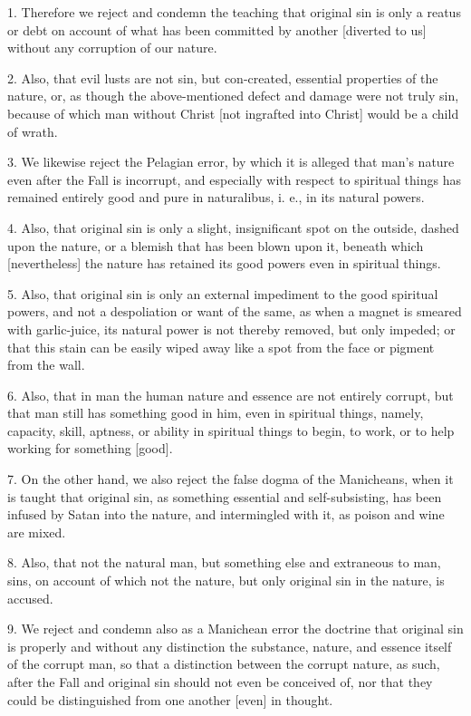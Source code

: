  1. Therefore we reject and condemn the teaching that original sin is only a reatus or debt on account of what has been committed by another [diverted to us] without any corruption of our nature.

 2. Also, that evil lusts are not sin, but con-created, essential properties of the nature, or, as though the above-mentioned defect and damage were not truly sin, because of which man without Christ [not ingrafted into Christ] would be a child of wrath.

 3. We likewise reject the Pelagian error, by which it is alleged that man's nature even after the Fall is incorrupt, and especially with respect to spiritual things has remained entirely good and pure in naturalibus, i. e., in its natural powers.

 4. Also, that original sin is only a slight, insignificant spot on the outside, dashed upon the nature, or a blemish that has been blown upon it, beneath which [nevertheless] the nature has retained its good powers even in spiritual things.

 5. Also, that original sin is only an external impediment to the good spiritual powers, and not a despoliation or want of the same, as when a magnet is smeared with garlic-juice, its natural power is not thereby removed, but only impeded; or that this stain can be easily wiped away like a spot from the face or pigment from the wall.

 6. Also, that in man the human nature and essence are not entirely corrupt, but that man still has something good in him, even in spiritual things, namely, capacity, skill, aptness, or ability in spiritual things to begin, to work, or to help working for something [good].

 7. On the other hand, we also reject the false dogma of the Manicheans, when it is taught that original sin, as something essential and self-subsisting, has been infused by Satan into the nature, and intermingled with it, as poison and wine are mixed.

 8. Also, that not the natural man, but something else and extraneous to man, sins, on account of which not the nature, but only original sin in the nature, is accused.

 9. We reject and condemn also as a Manichean error the doctrine that original sin is properly and without any distinction the substance, nature, and essence itself of the corrupt man, so that a distinction between the corrupt nature, as such, after the Fall and original sin should not even be conceived of, nor that they could be distinguished from one another [even] in thought.

